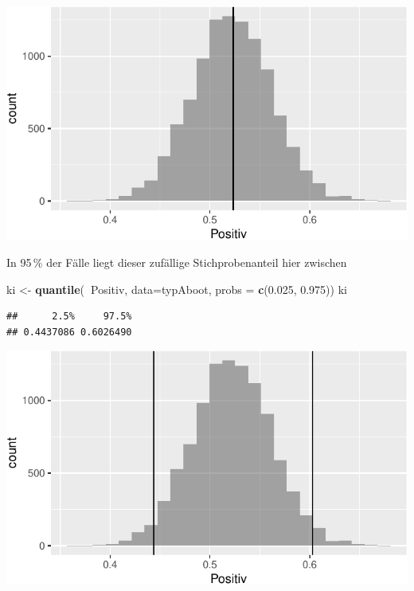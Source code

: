 \documentclass[12pt,ngerman,paper=a4,pagesize,DIV=13]{scrreprt}
\newenvironment{Shaded}{\begin{snugshade}}{\end{snugshade}}
\newcommand{\DataTypeTok}[1]{\textcolor[rgb]{0.13,0.29,0.53}{#1}}
\newcommand{\FloatTok}[1]{\textcolor[rgb]{0.00,0.00,0.81}{#1}}
\newcommand{\KeywordTok}[1]{\textcolor[rgb]{0.13,0.29,0.53}{\textbf{#1}}}
\newcommand{\NormalTok}[1]{#1}
\newcommand{\OperatorTok}[1]{\textcolor[rgb]{0.81,0.36,0.00}{\textbf{#1}}}
\newcommand{\StringTok}[1]{\textcolor[rgb]{0.31,0.60,0.02}{#1}}
\begin{document}
\includegraphics{DatenerhebungStatistik-Uebung_files/figure-latex/unnamed-chunk-90-1.pdf}

In 95\(\,\)\% der Fälle liegt dieser zufällige Stichprobenanteil hier
zwischen

\begin{Shaded}
\begin{Highlighting}[]
\NormalTok{ki <-}\StringTok{ }\KeywordTok{quantile}\NormalTok{(}\OperatorTok{~}\NormalTok{Positiv, }\DataTypeTok{data=}\NormalTok{typAboot, }\DataTypeTok{probs =} \KeywordTok{c}\NormalTok{(}\FloatTok{0.025}\NormalTok{, }\FloatTok{0.975}\NormalTok{))}
\NormalTok{ki}
\end{Highlighting}
\end{Shaded}

\begin{verbatim}
##      2.5%     97.5% 
## 0.4437086 0.6026490
\end{verbatim}

\begin{Shaded}
\end{Shaded}

\includegraphics{DatenerhebungStatistik-Uebung_files/figure-latex/unnamed-chunk-91-1.pdf}
\end{document}
